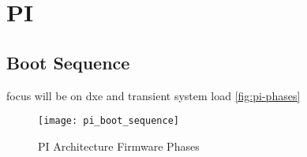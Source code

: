 
\section{\acf{PI}}

\subsection{Boot Sequence}


focus will be on dxe and transient system load
\autoref{fig:pi-phases}



\begin{figure}[htb]%
    \centering%
    \texttt{[image: pi\_boot\_sequence]}%
    \caption{\ac{PI} Architecture Firmware Phases \cite[Figure 2-1]{pi-spec}}%
    \label{fig:pi-phases}%
\end{figure}


